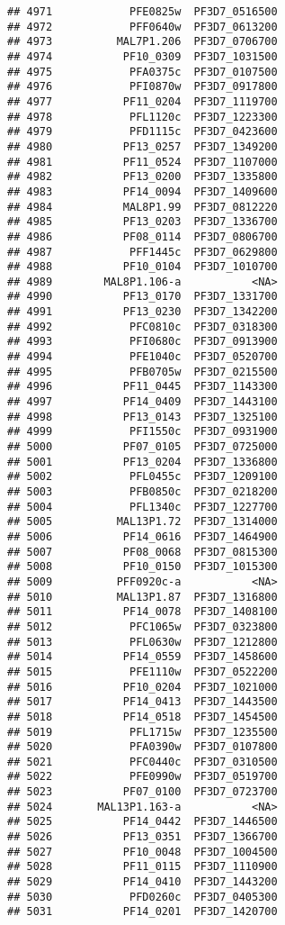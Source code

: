 \documentclass[12pt, a4paper]{article}\usepackage[]{graphicx}\usepackage[]{color}
\makeatletter
\newenvironment{kframe}{%
 \def\at@end@of@kframe{}%
 \ifinner\ifhmode%
  \def\at@end@of@kframe{\end{minipage}}%
  \begin{minipage}{\columnwidth}%
 \fi\fi%
 \def\FrameCommand##1{\hskip\@totalleftmargin \hskip-\fboxsep
 \colorbox{shadecolor}{##1}\hskip-\fboxsep
     \hskip-\linewidth \hskip-\@totalleftmargin \hskip\columnwidth}%
 \MakeFramed {\advance\hsize-\width
   \@totalleftmargin\z@ \linewidth\hsize
   \@setminipage}}%
 {\par\unskip\endMakeFramed%
 \at@end@of@kframe}
\newenvironment{knitrout}{}{} %
\makeatother
\begin{document}
\begin{knitrout}
\begin{kframe}
\begin{verbatim}
## 4971            PFE0825w  PF3D7_0516500
## 4972            PFF0640w  PF3D7_0613200
## 4973          MAL7P1.206  PF3D7_0706700
## 4974           PF10_0309  PF3D7_1031500
## 4975            PFA0375c  PF3D7_0107500
## 4976            PFI0870w  PF3D7_0917800
## 4977           PF11_0204  PF3D7_1119700
## 4978            PFL1120c  PF3D7_1223300
## 4979            PFD1115c  PF3D7_0423600
## 4980           PF13_0257  PF3D7_1349200
## 4981           PF11_0524  PF3D7_1107000
## 4982           PF13_0200  PF3D7_1335800
## 4983           PF14_0094  PF3D7_1409600
## 4984           MAL8P1.99  PF3D7_0812220
## 4985           PF13_0203  PF3D7_1336700
## 4986           PF08_0114  PF3D7_0806700
## 4987            PFF1445c  PF3D7_0629800
## 4988           PF10_0104  PF3D7_1010700
## 4989        MAL8P1.106-a           <NA>
## 4990           PF13_0170  PF3D7_1331700
## 4991           PF13_0230  PF3D7_1342200
## 4992            PFC0810c  PF3D7_0318300
## 4993            PFI0680c  PF3D7_0913900
## 4994            PFE1040c  PF3D7_0520700
## 4995            PFB0705w  PF3D7_0215500
## 4996           PF11_0445  PF3D7_1143300
## 4997           PF14_0409  PF3D7_1443100
## 4998           PF13_0143  PF3D7_1325100
## 4999            PFI1550c  PF3D7_0931900
## 5000           PF07_0105  PF3D7_0725000
## 5001           PF13_0204  PF3D7_1336800
## 5002            PFL0455c  PF3D7_1209100
## 5003            PFB0850c  PF3D7_0218200
## 5004            PFL1340c  PF3D7_1227700
## 5005          MAL13P1.72  PF3D7_1314000
## 5006           PF14_0616  PF3D7_1464900
## 5007           PF08_0068  PF3D7_0815300
## 5008           PF10_0150  PF3D7_1015300
## 5009          PFF0920c-a           <NA>
## 5010          MAL13P1.87  PF3D7_1316800
## 5011           PF14_0078  PF3D7_1408100
## 5012            PFC1065w  PF3D7_0323800
## 5013            PFL0630w  PF3D7_1212800
## 5014           PF14_0559  PF3D7_1458600
## 5015            PFE1110w  PF3D7_0522200
## 5016           PF10_0204  PF3D7_1021000
## 5017           PF14_0413  PF3D7_1443500
## 5018           PF14_0518  PF3D7_1454500
## 5019            PFL1715w  PF3D7_1235500
## 5020            PFA0390w  PF3D7_0107800
## 5021            PFC0440c  PF3D7_0310500
## 5022            PFE0990w  PF3D7_0519700
## 5023           PF07_0100  PF3D7_0723700
## 5024       MAL13P1.163-a           <NA>
## 5025           PF14_0442  PF3D7_1446500
## 5026           PF13_0351  PF3D7_1366700
## 5027           PF10_0048  PF3D7_1004500
## 5028           PF11_0115  PF3D7_1110900
## 5029           PF14_0410  PF3D7_1443200
## 5030            PFD0260c  PF3D7_0405300
## 5031           PF14_0201  PF3D7_1420700

\end{verbatim}
\end{kframe}
\end{knitrout}
\end{document}
